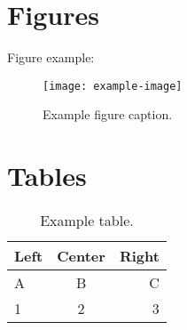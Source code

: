 \documentclass[a4paper, 12pt]{article}  %
\begin{document}
\section{Figures}
Figure example:
\begin{figure}[H]
    \centering
    \texttt{[image: example-image]}
    \caption{Example figure caption.}
    \label{fig:example}
\end{figure}

\section{Tables}
\begin{table}[H]
    \centering
    \begin{tabular}{l c r}
        \toprule
        Left & Center & Right \\
        \midrule
        A & B & C \\
        1 & 2 & 3 \\
        \bottomrule
    \end{tabular}
    \caption{Example table.}
    \label{tab:example}
\end{table}
\end{document}
